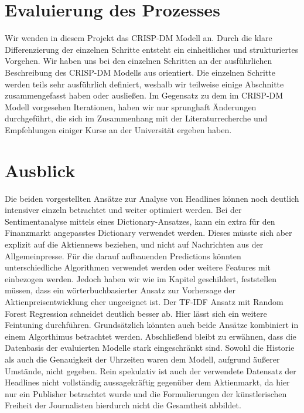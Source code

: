 \section{Evaluierung des Prozesses}
Wir wenden in diesem Projekt das CRISP-DM Modell an. Durch die klare Differenzierung der einzelnen Schritte entsteht ein einheitliches und strukturiertes Vorgehen. Wir haben uns bei den einzelnen Schritten an der ausführlichen Beschreibung des CRISP-DM Modells aus \citep{crispdm} orientiert. Die einzelnen Schritte werden teils sehr ausführlich definiert, weshalb wir teilweise einige Abschnitte zusammengefasst haben oder ausließen. Im Gegensatz zu dem im CRISP-DM Modell vorgesehen Iterationen, haben wir nur sprunghaft Änderungen durchgeführt, die sich im Zusammenhang mit der Literaturrecherche und Empfehlungen einiger Kurse an der Universität ergeben haben.

\section{Ausblick}
Die beiden vorgestellten Ansätze zur Analyse von Headlines können noch deutlich intensiver einzeln betrachtet und weiter optimiert werden. Bei der Sentimentanalyse mittels eines Dictionary-Ansatzes, kann ein extra für den Finanzmarkt angepasstes Dictionary verwendet werden. Dieses müsste sich aber explizit auf die Aktiennews beziehen, und nicht auf Nachrichten aus der Allgemeinpresse. Für die darauf aufbauenden Predictions könnten unterschiedliche Algorithmen verwendet werden oder weitere Features mit einbezogen werden. Jedoch haben wir wie im Kapitel geschildert, feststellen müssen, dass ein wörterbuchbasierter Ansatz zur Vorhersage der Aktienpreisentwicklung eher ungeeignet ist. Der TF-IDF Ansatz mit Random Forest Regression schneidet deutlich besser ab. Hier lässt sich ein weitere Feintuning durchführen. Grundsätzlich könnten auch beide Ansätze kombiniert in einem Algorthimus betrachtet werden. Abschließend bleibt zu erwähnen, dass die Datenbasis der evaluierten Modelle stark eingeschränkt sind. Sowohl die Historie als auch die Genauigkeit der Uhrzeiten waren dem Modell, aufgrund äußerer Umstände, nicht gegeben. Rein spekulativ ist auch der verwendete Datensatz der Headlines nicht vollständig aussagekräftig gegenüber dem Aktienmarkt, da hier nur ein Publisher betrachtet wurde und die Formulierungen der künstlerischen Freiheit der Journalisten hierdurch nicht die Gesamtheit abbildet.